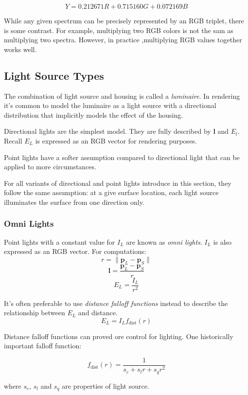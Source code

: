 \documentclass[10pt, a4paper]{article}
\begin{document}
        $$Y = 0.212671R + 0.715160G + 0.072169B$$

        While any given spectrum can be precisely represented by an RGB triplet, there is some contrast. For example, multiplying two RGB colors is not the sam as multiplying two spectra. However, in practice ,multiplying RGB values together works well.
    
    \subsection{Light Source Types}
        The combination of light source and housing is called a \emph{luminaire}. In rendering it's common to model the luminaire as a light source with a directional distribution that implicitly models the effect of the housing. 

        Directional lights are the simplest model. They are fully described by \textbf{l} and $E_l$. Recall $E_L$ is expressed as an RGB vector for rendering purposes. 
        
        Point lights have a softer assumption compared to directional light that can be applied to more circumstances. 

        For all variants of directional and point lights introduce in this section, they follow the same assumption: at a give surface location, each light source illuminates the surface from one direction only. 
        
        \subsubsection{Omni Lights}
            Point lights with a constant value for $I_L$ are known as \emph{omni lights}. $I_L$ is also expressed as an RGB vector. For computations: 
            $$r = \| \textbf{p}_L - \textbf{p}_S \|$$
            $$\textbf{l} = \frac{\textbf{p}_L - \textbf{p}_S}{r}$$
            $$E_L = \frac{I_L}{r^2}$$

            It's often  preferable to use \emph{distance falloff functions} instead to describe the relationship between $E_L$ and distance.
            $$E_L = I_Lf_{\text{dist}}(r)$$

            Distance falloff functions can proved ore control for lighting. One historically important falloff function: 

            $$f_{\text{dist}}(r) = \frac{1}{s_c + s_lr + s_qr^2}$$

            where $s_c$, $s_l$ and $s_q$ are properties of light source. 
\end{document}

